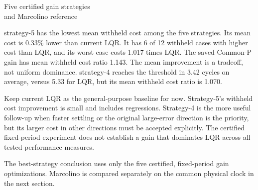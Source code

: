 \documentclass[11pt,a4paper]{article}
\begin{document}
\begin{center}{\Large Five certified gain strategies\\and Marcolino reference}\end{center}
strategy-5 has the lowest mean withheld cost among the five strategies. Its mean cost is 0.33\% lower than current LQR. It has 6 of 12 withheld cases with higher cost than LQR, and its worst case costs 1.017 times LQR. The saved Common-P gain has mean withheld cost ratio 1.143. The mean improvement is a tradeoff, not uniform dominance. strategy-4 reaches the threshold in 3.42 cycles on average, versus 5.33 for LQR, but its mean withheld cost ratio is 1.070.

Keep current LQR as the general-purpose baseline for now. Strategy-5's withheld cost improvement is small and includes regressions. Strategy-4 is the more useful follow-up when faster settling or the original large-error direction is the priority, but its larger cost in other directions must be accepted explicitly. The certified fixed-period experiment does not establish a gain that dominates LQR across all tested performance measures.

The best-strategy conclusion uses only the five certified, fixed-period gain optimizations. Marcolino is compared separately on the common physical clock in the next section.
\end{document}
